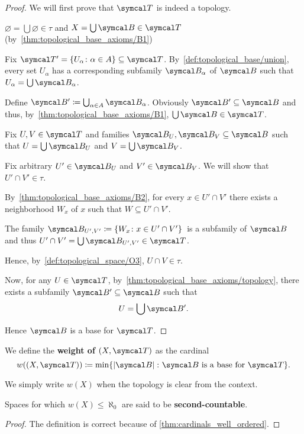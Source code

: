 \begin{proof}
  We will first prove that \( \Cal{T} \) is indeed a topology.

  \begin{description}
     \( \varnothing = \bigcup \varnothing \in \tau \) and \( X = \bigcup \Cal{B} \in \Cal{T} \) (by~\ref{thm:topological_base_axioms/B1})

     Fix \( \Cal{T}' = \{ U_\alpha \colon \alpha \in A \} \subseteq \Cal{T} \). By~\cref{def:topological_base/union}, every set \( U_\alpha \) has a corresponding subfamily \( \Cal{B}_\alpha \) of \( \Cal{B} \) such that \( U_\alpha = \bigcup \Cal{B}_\alpha \).

    Define \( \Cal{B}' \coloneqq \bigcup_{\alpha \in A} \Cal{B}_\alpha \). Obviously \( \Cal{B}' \subseteq \Cal{B} \) and thus, by~\ref{thm:topological_base_axioms/B1}, \( \bigcup \Cal{B} \in \Cal{T} \).

     Fix \( U, V \in \Cal{T} \) and families \( \Cal{B}_U, \Cal{B}_V \subseteq \Cal{B} \) such that \( U = \bigcup \Cal{B}_U \) and \( V = \bigcup \Cal{B}_V \).

    Fix arbitrary \( U' \in \Cal{B}_U \) and \( V' \in \Cal{B}_V \). We will show that \( U' \cap V' \in \tau \).

    By~\ref{thm:topological_base_axioms/B2}, for every \( x \in U' \cap V' \) there exists a neighborhood \( W_x \) of \( x \) such that \( W \subseteq U' \cap V' \).

    The family \( \Cal{B}_{U',V'} \coloneqq \{ W_x \colon x \in U' \cap V' \} \)~\AOC is a subfamily of \( \Cal{B} \) and thus \( U' \cap V' = \bigcup \Cal{B}_{U',V'} \in \Cal{T} \).

    Hence, by~\ref{def:topological_space/O3}, \( U \cap V \in \tau \).
  \end{description}

  Now, for any \( U \in \Cal{T} \), by~\cref{thm:topological_base_axioms/topology}, there exists a subfamily \( \Cal{B}' \subseteq \Cal{B} \) such that
  \begin{equation*}
    U = \bigcup \Cal{B}'.
  \end{equation*}

  Hence \( \Cal{B} \) is a base for \( \Cal{T} \).
\end{proof}

\begin{definition}\label{def:topological_space_weight}
  We define the \textbf{weight of \( (X, \Cal{T}) \)} as the cardinal
  \begin{equation*}
    w((X, \Cal{T})) \coloneqq \min \{ \Abs{\Cal{B}} \colon \Cal{B} \text{ is a base for } \Cal{T} \}.
  \end{equation*}

  We simply write \( w(X) \) when the topology is clear from the context.

  Spaces for which \( w(X) \leq \aleph_0 \) are said to be \textbf{second-countable}.
\end{definition}
\begin{proof}
  The definition is correct because of \cref{thm:cardinals_well_ordered}.
\end{proof}

